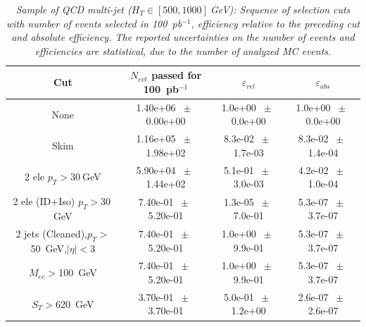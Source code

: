 \begin{table}[htbp] 
\begin{center} 
\begin{tabular}{|c|c|c|c|} 
\hline\hline 
 Cut & $N_{evt}$ passed for 100~pb$^{-1}$ & $\varepsilon_{rel}$ & $\varepsilon_{abs}$ \\ 
\hline\hline 
None       &        1.40e+06       $~\pm~$       0.00e+00        &        1.0e+00       $~\pm~$       0.0e+00        &        1.0e+00       $~\pm~$       0.0e+00       \\       
       Skim       &        1.16e+05       $~\pm~$       1.98e+02        &        8.3e-02       $~\pm~$       1.7e-03        &        8.3e-02       $~\pm~$       1.4e-04       \\       
       2 ele $p_T>30~$GeV       &        5.90e+04       $~\pm~$       1.44e+02        &        5.1e-01       $~\pm~$       3.0e-03        &        4.2e-02       $~\pm~$       1.0e-04       \\       
       2 ele (ID+Iso) $p_T>30~$GeV       &        7.40e-01       $~\pm~$       5.20e-01        &        1.3e-05       $~\pm~$       7.0e-01        &        5.3e-07       $~\pm~$       3.7e-07       \\       
       2 jets (Cleaned),$p_T>$50~GeV,$|\eta|<$3       &        7.40e-01       $~\pm~$       5.20e-01        &        1.0e+00       $~\pm~$       9.9e-01        &        5.3e-07       $~\pm~$       3.7e-07       \\       
       $M_{ee}>$100~GeV       &        7.40e-01       $~\pm~$       5.20e-01        &        1.0e+00       $~\pm~$       9.9e-01        &        5.3e-07       $~\pm~$       3.7e-07       \\       
       $S_T>$620~GeV       &        3.70e-01       $~\pm~$       3.70e-01        &        5.0e-01       $~\pm~$       1.2e+00        &        2.6e-07       $~\pm~$       2.6e-07       \\       
       \hline\hline 
\end{tabular} 
\end{center} 
\caption{\small \sl Sample of QCD multi-jet ($H_T \in [500,1000]~$GeV): Sequence of selection cuts with number of events selected in 100~pb$^{-1}$, efficiency relative to the preceding cut and absolute efficiency. The reported uncertainties on the number of events and efficiencies are statistical, due to the number of analyzed MC events.} 
\label{tab:effic-QCD-500-1000} 
\end{table} 

